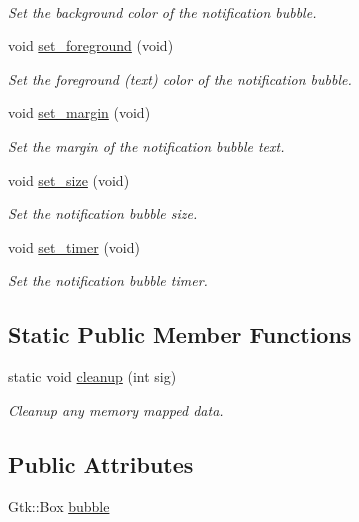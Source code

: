 \begin{DoxyCompactItemize}
$$\begin{DoxyCompactList}\small\item\em Set the background color of the notification bubble. \end{DoxyCompactList}\item 
void \hyperlink{classAriaNotify_a8befc6cd8cc6c3bfd9fb498ca43149df}{set\+\_\+foreground} (void)
\begin{DoxyCompactList}\small\item\em Set the foreground (text) color of the notification bubble. \end{DoxyCompactList}\item 
void \hyperlink{classAriaNotify_abdc3c582bed37b641270135f701f8c94}{set\+\_\+margin} (void)
\begin{DoxyCompactList}\small\item\em Set the margin of the notification bubble text. \end{DoxyCompactList}\item 
void \hyperlink{classAriaNotify_ac3a070a586a3ac7470479c23bb8619c1}{set\+\_\+size} (void)
\begin{DoxyCompactList}\small\item\em Set the notification bubble size. \end{DoxyCompactList}\item 
void \hyperlink{classAriaNotify_a11a1357c1243a781dabcce8c545838e4}{set\+\_\+timer} (void)
\begin{DoxyCompactList}\small\item\em Set the notification bubble timer. \end{DoxyCompactList}\end{DoxyCompactItemize}
\subsection*{Static Public Member Functions}
\begin{DoxyCompactItemize}
\item 
static void \hyperlink{classAriaNotify_ae9a1c13596ad8a7b1f363755c43ee72a}{cleanup} (int sig)
\begin{DoxyCompactList}\small\item\em Cleanup any memory mapped data. \end{DoxyCompactList}\end{DoxyCompactItemize}
\subsection*{Public Attributes}
\begin{DoxyCompactItemize}
\item 
Gtk\+::\+Box \hyperlink{classAriaNotify_acf839bd737ad1f569e868a886f1760f5}{bubble}
\end{DoxyCompactItemize}


